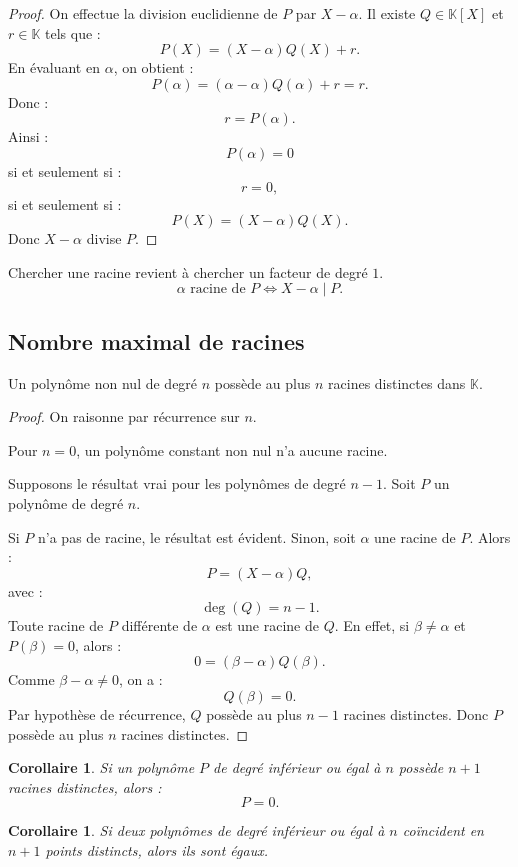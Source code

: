 \documentclass[11pt,a4paper]{article}
\newcommand{\K}{\mathbb K}
\newtheorem{corollaire}[prop]{Corollaire}
\begin{document}
\begin{proof}
On effectue la division euclidienne de \(P\) par \(X-\alpha\).  
Il existe \(Q\in\K[X]\) et \(r\in\K\) tels que :
\[
P(X)=(X-\alpha)Q(X)+r.
\]
En évaluant en \(\alpha\), on obtient :
\[
P(\alpha)=(\alpha-\alpha)Q(\alpha)+r=r.
\]
Donc :
\[
r=P(\alpha).
\]
Ainsi :
\[
P(\alpha)=0
\]
si et seulement si :
\[
r=0,
\]
si et seulement si :
\[
P(X)=(X-\alpha)Q(X).
\]
Donc \(X-\alpha\) divise \(P\).
\end{proof}

\begin{retenirbox}
Chercher une racine revient à chercher un facteur de degré \(1\).
\[
\alpha\text{ racine de }P
\Longleftrightarrow
X-\alpha\mid P.
\]
\end{retenirbox}

\subsection{Nombre maximal de racines}

\begin{theorembox}
Un polynôme non nul de degré \(n\) possède au plus \(n\) racines distinctes dans \(\K\).
\end{theorembox}

\begin{proof}
On raisonne par récurrence sur \(n\).

Pour \(n=0\), un polynôme constant non nul n'a aucune racine.

Supposons le résultat vrai pour les polynômes de degré \(n-1\).  
Soit \(P\) un polynôme de degré \(n\).

Si \(P\) n'a pas de racine, le résultat est évident.  
Sinon, soit \(\alpha\) une racine de \(P\).  
Alors :
\[
P=(X-\alpha)Q,
\]
avec :
\[
\deg(Q)=n-1.
\]
Toute racine de \(P\) différente de \(\alpha\) est une racine de \(Q\).  
En effet, si \(\beta\neq\alpha\) et \(P(\beta)=0\), alors :
\[
0=(\beta-\alpha)Q(\beta).
\]
Comme \(\beta-\alpha\neq0\), on a :
\[
Q(\beta)=0.
\]
Par hypothèse de récurrence, \(Q\) possède au plus \(n-1\) racines distinctes.  
Donc \(P\) possède au plus \(n\) racines distinctes.
\end{proof}

\begin{corollaire}
Si un polynôme \(P\) de degré inférieur ou égal à \(n\) possède \(n+1\) racines distinctes, alors :
\[
P=0.
\]
\end{corollaire}

\begin{corollaire}
Si deux polynômes de degré inférieur ou égal à \(n\) coïncident en \(n+1\) points distincts, alors ils sont égaux.
\end{corollaire}
\end{document}

